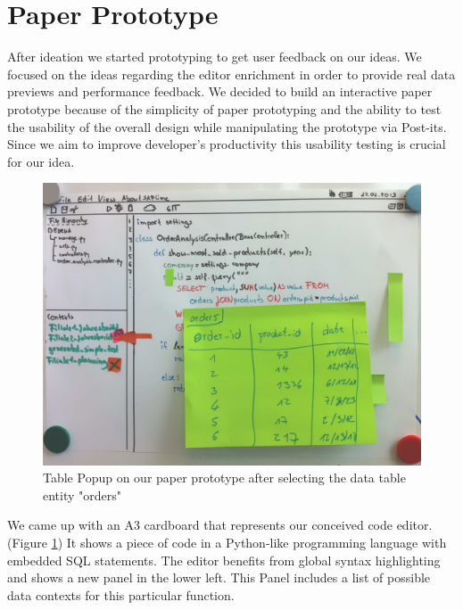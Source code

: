
\section{Paper Prototype}
\label{sec:PAPER_PROTOTYPE}

After ideation we started prototyping to get user feedback on our ideas. 
We focused on the ideas regarding the editor enrichment in order to provide real data previews and performance feedback.
We decided to build an interactive paper prototype because of the simplicity of paper prototyping and the ability to test the usability of the overall design while manipulating the prototype via Post-its.
Since we aim to improve developer's productivity this usability testing is crucial for our idea. \\


\begin{figure}
\begin{centering}
    \includegraphics[width=0.8\linewidth]{images/paper_prototype2}
    \caption{Table Popup on our paper prototype after selecting the data table entity "orders"}
    \label{fig:paper_prototype2}
\end{centering}
\end{figure}

We came up with an A3 cardboard that represents our conceived code editor. (Figure \ref{fig:paper_prototype2})
It shows a piece of code in a Python-like programming language with embedded SQL statements.
The editor benefits from global syntax highlighting and shows a new panel in the lower left.
This Panel includes a list of possible data contexts for this particular function.\\


